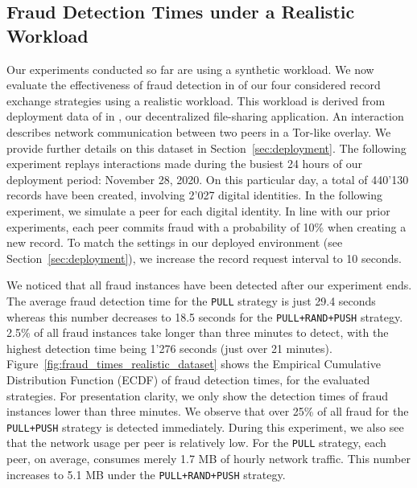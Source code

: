 \subsection{Fraud Detection Times under a Realistic Workload}
\label{subsec:realistic_workload}
Our experiments conducted so far are using a synthetic workload.
We now evaluate the effectiveness of fraud detection in \TrustChain{} of our four considered record exchange strategies using a realistic workload.
This workload is derived from deployment data of \TrustChain{} in \Tribler{}, our decentralized file-sharing application.
An interaction describes network communication between two peers in a Tor-like overlay.
We provide further details on this dataset in Section~\ref{sec:deployment}.
The following experiment replays interactions made during the busiest 24 hours of our deployment period: November 28, 2020.
On this particular day, a total of 440'130 records have been created, involving 2'027 digital identities.
In the following experiment, we simulate a peer for each digital identity.
In line with our prior experiments, each peer commits fraud with a probability of 10\% when creating a new record.
To match the \TrustChain{} settings in our deployed environment (see Section~\ref{sec:deployment}), we increase the record request interval to 10 seconds.

We noticed that all fraud instances have been detected after our experiment ends.
The average fraud detection time for the \texttt{PULL} strategy is just 29.4 seconds whereas this number decreases to 18.5 seconds for the \texttt{PULL+RAND+PUSH} strategy.
2.5\% of all fraud instances take longer than three minutes to detect, with the highest detection time being 1'276 seconds (just over 21 minutes).
Figure~\ref{fig:fraud_times_realistic_dataset} shows the Empirical Cumulative Distribution Function (ECDF) of fraud detection times, for the evaluated strategies.
For presentation clarity, we only show the detection times of fraud instances lower than three minutes.
We observe that over 25\% of all fraud for the \texttt{PULL+PUSH} strategy is detected immediately.
During this experiment, we also see that the network usage per peer is relatively low.
For the \texttt{PULL} strategy, each peer, on average, consumes merely 1.7 MB of hourly network traffic.
This number increases to 5.1 MB under the \texttt{PULL+RAND+PUSH} strategy.

